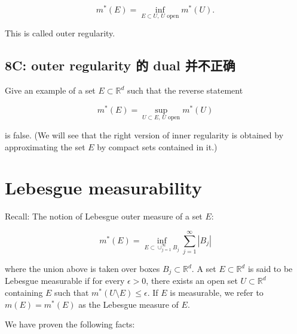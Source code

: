 \documentclass[lang=cn,11pt]{template}
\begin{document}
\[
m^*(E) = \inf_{E \subset U, \, U \text{ open}} m^*(U).
\]

This is called outer regularity.

\section*{8C: outer regularity 的 dual 并不正确} 
Give an example of a set $E \subset \mathbb{R}^d$ such that the reverse statement

\[
m^*(E) = \sup_{U \subset E, \, U \text{ open}} m^*(U)
\]

is false. (We will see that the right version of inner regularity is obtained by approximating the set $E$ by compact sets contained in it.)


\newpage
\chapter{Lebesgue measurability}

Recall: The notion of Lebesgue outer measure of a set \( E \):

\[
m^*(E) = \inf_{E \subset \cup_{j=1}^{\infty} B_j} \sum_{j=1}^{\infty} |B_j|
\]

where the union above is taken over boxes \( B_j \subset \mathbb{R}^d \). A set \( E \subset \mathbb{R}^d \) is said to be Lebesgue measurable if for every \( \epsilon > 0 \), there exists an open set \( U \subset \mathbb{R}^d \) containing \( E \) such that \( m^*(U \setminus E) \leq \epsilon \). If \( E \) is measurable, we refer to \( m(E) = m^*(E) \) as the Lebesgue measure of \( E \).

We have proven the following facts:
\end{document}
